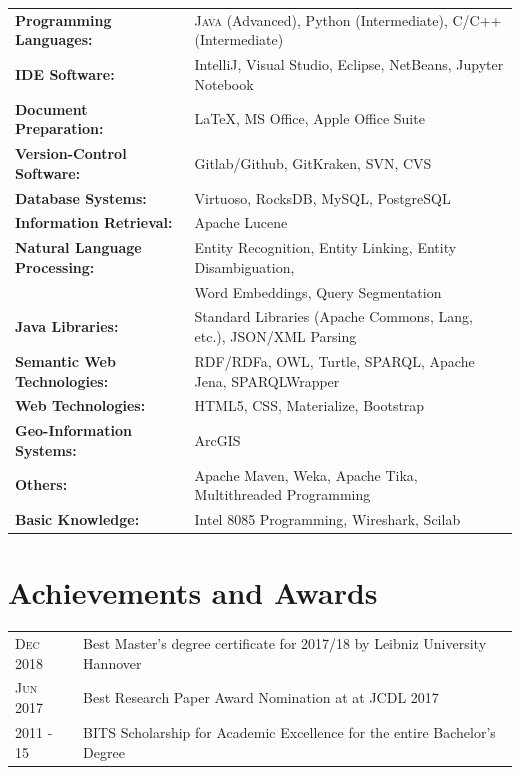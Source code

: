 \documentclass[a4paper,10pt]{article} %
\begin{document}
\begin{tabular}{ll}
\textbf{Programming Languages:} & \textsc{Java} (Advanced), Python (Intermediate), \textsc{C/C++} (Intermediate)\\
\textbf{IDE Software:} & IntelliJ, Visual Studio, Eclipse, NetBeans, Jupyter Notebook\\
\textbf{Document Preparation:} & LaTeX, MS Office, Apple Office Suite\\
\textbf{Version-Control Software:} & Gitlab/Github, GitKraken, \textsc{SVN}, \textsc{CVS}\\
\textbf{Database Systems:} & Virtuoso, RocksDB, My\textsc{SQL}, Postgre\textsc{SQL}\\
\textbf{Information Retrieval:} & Apache Lucene\\
\textbf{Natural Language Processing:} & Entity Recognition, Entity Linking, Entity Disambiguation,\\
									  & Word Embeddings, Query Segmentation\\
\textbf{Java Libraries:} & Standard Libraries (Apache Commons, Lang, etc.), JSON/XML Parsing\\
\textbf{Semantic Web Technologies:} & RDF/RDFa, \textsc{OWL}, Turtle, \textsc{SPARQL}, Apache Jena, SPARQLWrapper\\
\textbf{Web Technologies:} & HTML5, CSS, Materialize, Bootstrap\\
\textbf{Geo-Information Systems:} & ArcGIS\\
\textbf{Others:} & Apache Maven, Weka, Apache Tika, Multithreaded Programming\\
\textbf{Basic Knowledge:} & Intel 8085 Programming, Wireshark, Scilab\\
\end{tabular}


\section{Achievements and Awards}

\begin{tabular}{ll}
\textsc{Dec} 2018 & Best Master's degree certificate for 2017/18 by Leibniz University Hannover\\
\textsc{Jun} 2017 & Best Research Paper Award Nomination at at JCDL 2017\\
\textsc{2011 - 15} & BITS Scholarship for Academic Excellence for the entire Bachelor’s Degree\\
\end{tabular}
\end{document}
